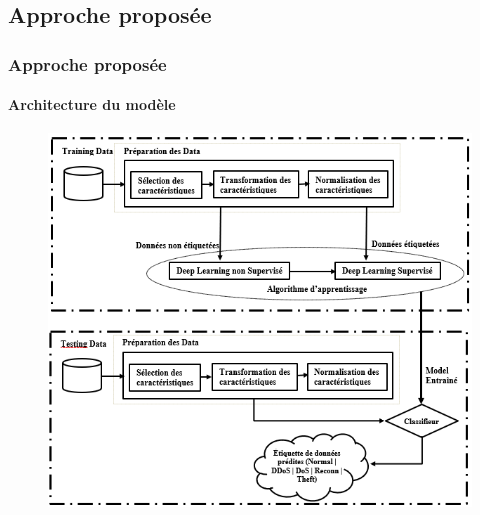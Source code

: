 \documentclass[aspectratio=169,professionalfonts, 12pt]{beamer}
\begin{document}
\subsection{Approche proposée}
\begin{frame}
   \frametitle{Approche proposée}
  \framesubtitle{Architecture du modèle}
  	\begin{figure}[t]
	       \centering
	       \includegraphics[height=0.8\textheight]{images/architecture}
	    \end{figure}
  
\end{frame}
\end{document}

